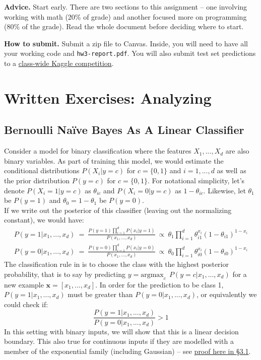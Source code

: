 \documentclass[a4paper,10pt]{article}
\begin{document}
\noindent\textbf{Advice.} Start early. There are two sections to this assignment -- one involving working with math (20\% of grade) and another focused more on programming (80\% of the grade). Read the whole document before deciding where to start. 

\noindent\textbf{How to submit.} Submit a zip file to Canvas. Inside, you will need to have all your working code and \lstinline{hw3-report.pdf}. You will also submit test set predictions to a \href{https://www.kaggle.com/t/c4de5ee4c2ef45858c15e3183d24b2c0}{class-wide Kaggle competition}. 

\vspace{-10pt}
\section{Written Exercises: Analyzing \nb [5pts]}

\vspace{-20pt}
\subsection{Bernoulli Na\"ive Bayes As A Linear Classifier}
Consider a \nb model for binary classification where the features $X_1, ..., X_d$ are also binary variables. As part of training this \nb model, we would estimate the conditional distributions $P(X_i | y{=}c)$ for $c=\{0,1\}$ and $i=1,...,d$ as well as the prior distribution $P(y{=}c)$ for $c=\{0,1\}$. For notational simplicity, let's denote $P(X_i{=}1 | y{=}c)$ as $\theta_{ic}$ and $P(X_i{=}0 | y{=}c)$ as $1-\theta_{ic}$. Likewise, let $\theta_1$ be $P(y{=}1)$ and $\theta_0 = 1-\theta_1$ be $P(y{=}0)$. \\

\noindent If we write out the posterior of this classifier (leaving out the normalizing constant), we would have:
%
\begin{eqnarray}
    P(y=1 | x_1,...,x_d) ~=~ \frac{P(y=1) \prod_{i=1}^d P(x_i | y=1)}{P(x_1, ..., x_d)} ~\propto~ \theta_1 \prod_{i=1}^d \theta_{i1}^{x_i} (1-\theta_{i1})^{1-x_i}\label{eq:post1}\\[5pt]
    P(y=0 | x_1,...,x_d) ~=~ \frac{P(y=0)\prod_{i=1}^dP(x_i | y=0)}{P(x_1, ..., x_d)} ~\propto~ \theta_0 \prod_{i=1}^d \theta_{i0}^{x_i} (1-\theta_{i0})^{1-x_i}
    \label{eq:post2}
\end{eqnarray}
%
\noindent The classification rule in \nb is to choose the class with the highest posterior probability, that is to say by predicting $y = \mbox{argmax}_{c}~~P(y=c|x_1,...,x_d)$ for a new example $\mathbf{x} = [x_1, ..., x_d]$. In order for the prediction to be class 1, $P(y=1 | x_1,...,x_d)$ must be greater than $P(y=0 | x_1,...,x_d)$, or equivalently we could check if:
%
\begin{equation}
    \frac{P(y=1 | x_1,...,x_d)}{P(y=0 | x_1,...,x_d)} > 1
    \label{eq:logratio}
\end{equation}
%
\noindent In this setting with binary inputs, we will show that this is a linear decision boundary. This also true for continuous inputs if they are modelled with a member of the exponential family (including Gaussian) -- see \href{https://www.cs.cmu.edu/~tom/mlbook/NBayesLogReg.pdf}{proof here in \S 3.1}. 
\end{document}
